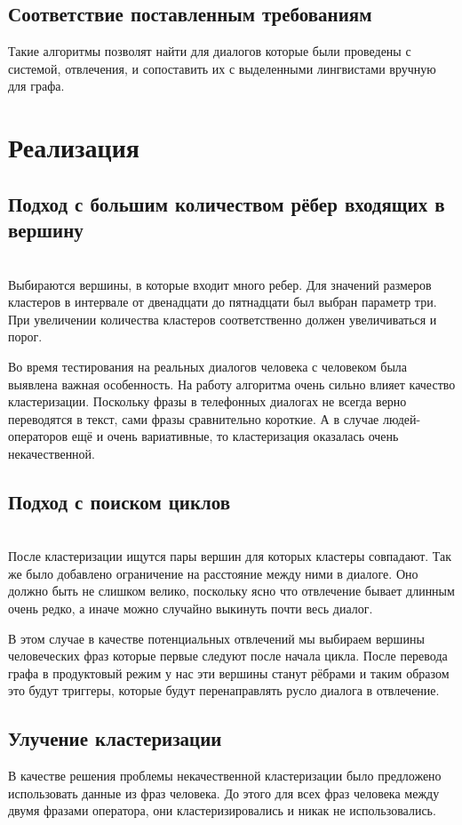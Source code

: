\documentclass[specification,annotation]{itmo-student-thesis}
\begin{document}
	\section{Соответствие поставленным требованиям}
	Такие алгоритмы позволят найти для диалогов которые были проведены с системой, отвлечения, и сопоставить их с выделенными лингвистами вручную для графа.
	
	\chapter{Реализация}
	\section{Подход с большим количеством рёбер входящих в вершину}\\
	Выбираются вершины, в которые входит много ребер. Для значений размеров кластеров в интервале от двенадцати до пятнадцати был выбран параметр три. При увеличении количества кластеров соответственно должен увеличиваться и порог.
	
	Во время тестирования на реальных диалогов человека с человеком была выявлена важная особенность. На работу алгоритма очень сильно влияет качество кластеризации. Поскольку фразы в телефонных диалогах не всегда верно переводятся в текст, сами фразы сравнительно короткие. А в случае людей-операторов ещё и очень вариативные, то кластеризация оказалась очень некачественной.
	
	\section{Подход с поиском циклов}\\
	После кластеризации ищутся пары вершин для которых кластеры совпадают. Так же было добавлено ограничение на расстояние между ними в диалоге. Оно должно быть не слишком велико, поскольку ясно что отвлечение бывает длинным очень редко, а иначе можно случайно выкинуть почти весь диалог.
	
	В этом случае в качестве потенциальных отвлечений мы выбираем вершины человеческих фраз которые первые следуют после начала цикла. После перевода графа в продуктовый режим у нас эти вершины станут рёбрами и таким образом это будут триггеры, которые будут перенаправлять русло диалога в отвлечение.
	\section{Улучение кластеризации}
	В качестве решения проблемы некачественной кластеризации было предложено использовать данные из фраз человека. До этого для всех фраз человека между двумя фразами оператора, они кластеризировались и никак не использовались. 
	
\end{document}
